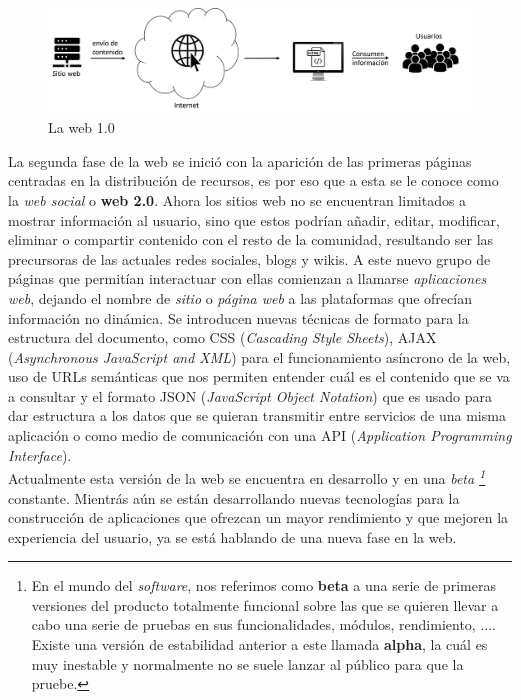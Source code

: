\documentclass[../main.tex]{subfiles}
\begin{document}
     \begin{figure}[!h]
          \centering
          \includegraphics[width=\textwidth]{images/web1.0.png}
          \caption{La web 1.0}
          \label{fig:web1.0}
      \end{figure}
     
     La segunda fase de la web se inició con la aparición de las primeras páginas centradas en la distribución de recursos, es por eso que a esta se le conoce como la \textit{web social} o \textbf{web 2.0}. Ahora los sitios web no se encuentran limitados a mostrar información al usuario, sino que estos podrían añadir, editar, modificar, eliminar o compartir contenido con el resto de la comunidad, resultando ser las precursoras de las actuales redes sociales, blogs y wikis. A este nuevo grupo de páginas que permitían interactuar con ellas comienzan a llamarse \textit{aplicaciones web}, dejando el nombre de \textit{sitio} o \textit{página web} a las plataformas que ofrecían información no dinámica. Se introducen nuevas técnicas de formato para la estructura del documento, como CSS (\textit{Cascading Style Sheets}), AJAX (\textit{Asynchronous JavaScript and XML}) para el funcionamiento asíncrono de la web, uso de URLs semánticas que nos permiten entender cuál es el contenido que se va a consultar y el formato JSON (\textit{JavaScript Object Notation}) que es usado para dar estructura a los datos que se quieran transmitir entre servicios de una misma aplicación o como medio de comunicación con una API \cite{whatisAPI} (\textit{Application Programming Interface}).\\
     
     Actualmente esta versión de la web se encuentra en desarrollo y en una \textit{beta \footnote{En el mundo del \textit{software}, nos referimos como \textbf{beta} a una serie de primeras versiones del producto totalmente funcional sobre las que se quieren llevar a cabo una serie de pruebas en sus funcionalidades, módulos, rendimiento, .... Existe una versión de estabilidad anterior a este llamada \textbf{alpha}, la cuál es muy inestable y normalmente no se suele lanzar al público para que la pruebe. }} constante. Mientrás aún se están desarrollando nuevas tecnologías para la construcción de aplicaciones que ofrezcan un mayor rendimiento y que mejoren la experiencia del usuario, ya se está hablando de una nueva fase en la web. \\
     
\end{document}
